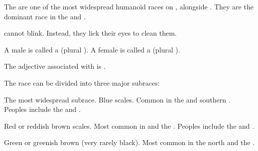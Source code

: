 \begin{gloss}
The \scathae{} are one of the most widespread humanoid races on \Miith{}, alongside . 
They are the dominant race in the  and . 

\Scathae{} cannot blink. 
Instead, they lick their eyes to clean them. 

\index{\dax}
\index{\sphyle}
A male \scatha{} is called a \dax{} (plural \daxes). 
A female is called a \sphyle{} (plural \sphyles). 

The adjective associated with \quo{\scatha} is \quo{\scathaese}. 

The \scathaese{} race can be divided into three major subraces: 

\begin{subgloss}
  \begin{comment}
  \subparagraph{\Tassian}
  \end{comment}
  \gitem[\Tassians]{\Tassian}
    The most widespread subrace. 
    Blue scales. 
    Common in the  and southern . 
    Peoples include the  and . 
    
  \begin{comment}
  \subparagraph{\Mekrii}
  \end{comment}
  \gitem[\Mekriis]{\Mekrii}
    Red or reddish brown scales.
    Most common in  and the . 
    Peoples include the  and . 
    
  \begin{comment}
  \subparagraph{\Loi}
  \end{comment}
  \gitem[\Lois]{\Loi}
    Green or greenish brown (very rarely black).
    Most common in the north and the {\Serplands}. 
\end{subgloss}








 
\end{gloss}









